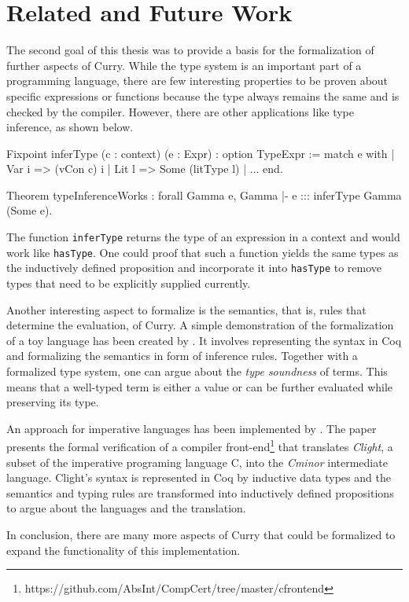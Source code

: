 \documentclass[paper = a4, fleqn, abstract=on, twoside]{scrreprt}
\begin{document}
\section{Related and Future Work}
The second goal of this thesis was to provide a basis for the formalization of further aspects of Curry. While the type system is an important part of a programming language, there are few interesting properties to be proven about specific expressions or functions because the type always remains the same and is checked by the compiler. However, there are other applications like type inference, as shown below.
\begin{coqcode}
Fixpoint inferType (c : context) (e : Expr) : option TypeExpr :=
  match e with
  | Var i => (vCon c) i
  | Lit l => Some (litType l)
  | ...
  end.
  
Theorem typeInferenceWorks : forall Gamma e, Gamma |- e ::: inferType Gamma (Some e).
\end{coqcode}
The function \texttt{inferType} returns the type of an expression in a context and would work like \texttt{hasType}. One could proof that such a function yields the same types as the inductively defined proposition and incorporate it into \texttt{hasType} to remove types that need to be explicitly supplied currently.\\
\par \noindent
Another interesting aspect to formalize is the semantics, that is, rules that determine the evaluation, of Curry. A simple demonstration of the formalization of a toy language has been created by \citet{Pierce:SF}. It involves representing the syntax in Coq and formalizing the semantics in form of inference rules. Together with a formalized type system, one can argue about the \textit{type soundness} of terms. This means that a well-typed term is either a value or can be further evaluated while preserving its type.\\
\par \noindent
An approach for imperative languages has been implemented by \citet{2006-Leroy-Blazy-Dargaye}. The paper presents the formal verification of a compiler front-end\footnote{https://github.com/AbsInt/CompCert/tree/master/cfrontend} that translates \textit{Clight}, a subset of the imperative programing language C, into the \textit{Cminor} intermediate language. Clight's syntax is represented in Coq by inductive data types and the semantics and typing rules are transformed into inductively defined propositions to argue about the languages and the translation.\\
\par \noindent
In conclusion, there are many more aspects of Curry that could be formalized to expand the functionality of this implementation. 
\appendix


\end{document}
